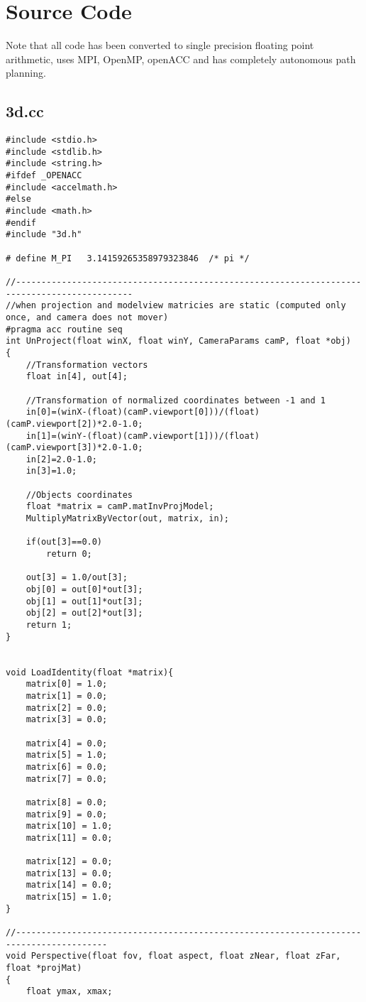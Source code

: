 \documentclass[]{article}
\begin{document}
\section{Source Code}
Note that all code has been converted to single precision floating point arithmetic, uses MPI,  OpenMP, openACC and has completely autonomous path planning.

\subsection{3d.cc}
\begin{Verbatim}[fontsize= \footnotesize, tabsize=4]
#include <stdio.h>
#include <stdlib.h>
#include <string.h>
#ifdef _OPENACC
#include <accelmath.h>
#else
#include <math.h>
#endif
#include "3d.h"

# define M_PI   3.14159265358979323846  /* pi */

//---------------------------------------------------------------------------------------------
//when projection and modelview matricies are static (computed only once, and camera does not mover)
#pragma acc routine seq
int UnProject(float winX, float winY, CameraParams camP, float *obj)
{
	//Transformation vectors
	float in[4], out[4];
	
	//Transformation of normalized coordinates between -1 and 1
	in[0]=(winX-(float)(camP.viewport[0]))/(float)(camP.viewport[2])*2.0-1.0;
	in[1]=(winY-(float)(camP.viewport[1]))/(float)(camP.viewport[3])*2.0-1.0;
	in[2]=2.0-1.0;
	in[3]=1.0;
	
	//Objects coordinates
	float *matrix = camP.matInvProjModel;
	MultiplyMatrixByVector(out, matrix, in);
	
	if(out[3]==0.0)
		return 0;

	out[3] = 1.0/out[3];
	obj[0] = out[0]*out[3];
	obj[1] = out[1]*out[3];
	obj[2] = out[2]*out[3];
	return 1;
}


void LoadIdentity(float *matrix){
	matrix[0] = 1.0;
	matrix[1] = 0.0;
	matrix[2] = 0.0;
	matrix[3] = 0.0;
	
	matrix[4] = 0.0;
	matrix[5] = 1.0;
	matrix[6] = 0.0;
	matrix[7] = 0.0;

	matrix[8] = 0.0;
	matrix[9] = 0.0;
	matrix[10] = 1.0;
	matrix[11] = 0.0;
	
	matrix[12] = 0.0;
	matrix[13] = 0.0;
	matrix[14] = 0.0;
	matrix[15] = 1.0;
}

//----------------------------------------------------------------------------------------
void Perspective(float fov, float aspect, float zNear, float zFar, float *projMat)
{
	float ymax, xmax;
	

\end{Verbatim}
\end{document}
